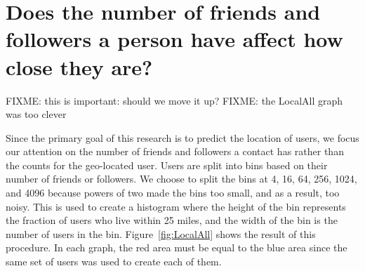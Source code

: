 %
%

\section{Does the number of friends and followers a person have affect how
close they are?}

FIXME: this is important: should we move it up?
FIXME: the LocalAll graph was too clever

Since the primary goal of this research is to predict the location of users, we
focus our attention on the number of friends and followers a contact has rather
than the counts for the geo-located user.
Users are split into bins based on their number of friends or followers.
We choose to split the bins at 4, 16, 64, 256, 1024, and 4096 because powers
of two made the bins too small, and as a result, too noisy.
This is used to create a histogram where the height of the bin represents the
fraction of users who live within 25 miles, and the width of the bin is the
number of users in the bin.
Figure~\ref{fig:LocalAll} shows the result of this procedure.
In each graph, the red area must be equal to the blue area since the same set
of users was used to create each of them.

